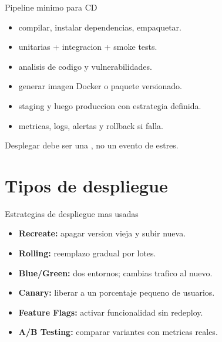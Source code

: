 \documentclass[aspectratio=169]{beamer}
\begin{document}
\begin{frame}{Pipeline minimo para CD}
	\begin{itemize}
		\item {} compilar, instalar dependencias, empaquetar.
		\item {} unitarias + integracion + smoke tests.
		\item {} analisis de codigo y vulnerabilidades.
		\item {} generar imagen Docker o paquete versionado.
		\item {} staging y luego produccion con estrategia definida.
		\item {} metricas, logs, alertas y rollback si falla.
	\end{itemize}
	\begin{orangebox}
		Desplegar debe ser una , no un evento de estres.
	\end{orangebox}
\end{frame}

\section{Tipos de despliegue}

\begin{frame}{Estrategias de despliegue mas usadas}
	\begin{comparebox}
		\begin{darkbox}
			\begin{itemize}
				\item \textbf{Recreate:} apagar version vieja y subir nueva.
				\item \textbf{Rolling:} reemplazo gradual por lotes.
				\item \textbf{Blue/Green:} dos entornos; cambias trafico al nuevo.
			\end{itemize}
		\end{darkbox}
	\comparebreak
		\begin{darkbox}
			\begin{itemize}
				\item \textbf{Canary:} liberar a un porcentaje pequeno de usuarios.
				\item \textbf{Feature Flags:} activar funcionalidad sin redeploy.
				\item \textbf{A/B Testing:} comparar variantes con metricas reales.
			\end{itemize}
		\end{darkbox}
	\end{comparebox}
\end{frame}
\end{document}
